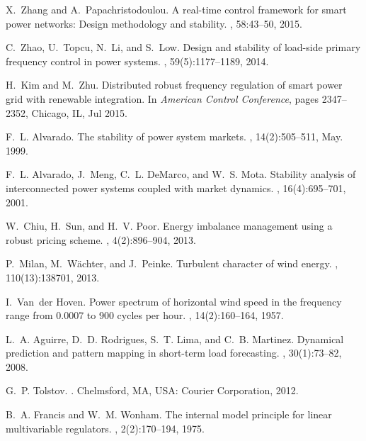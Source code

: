 \documentclass[journal]{IEEEtran}
\begin{document}
\begin{thebibliography}{10}
X.~Zhang and A.~Papachristodoulou.
\newblock A real-time control framework for smart power networks: Design
  methodology and stability.
, 58:43--50, 2015.

C.~Zhao, U.~Topcu, N.~Li, and S.~Low.
\newblock Design and stability of load-side primary frequency control in power
  systems.
, 59(5):1177--1189, 2014.

H.~Kim and M.~Zhu.
\newblock Distributed robust frequency regulation of smart power grid with
  renewable integration.
\newblock In {\em American Control Conference}, pages 2347--2352, Chicago, IL,
  Jul 2015.

F.~L. Alvarado.
\newblock The stability of power system markets.
, 14(2):505--511, May. 1999.

F.~L. Alvarado, J.~Meng, C.~L. DeMarco, and W.~S. Mota.
\newblock Stability analysis of interconnected power systems coupled with
  market dynamics.
, 16(4):695--701, 2001.

W.~Chiu, H.~Sun, and H.~V. Poor.
\newblock Energy imbalance management using a robust pricing scheme.
, 4(2):896--904, 2013.

P.~Milan, M.~W{\"a}chter, and J.~Peinke.
\newblock Turbulent character of wind energy.
, 110(13):138701, 2013.

I.~Van~der Hoven.
\newblock Power spectrum of horizontal wind speed in the frequency range from
  0.0007 to 900 cycles per hour.
, 14(2):160--164, 1957.

L.~A. Aguirre, D.~D. Rodrigues, S.~T. Lima, and C.~B. Martinez.
\newblock Dynamical prediction and pattern mapping in short-term load
  forecasting.
,
  30(1):73--82, 2008.

G.~P. Tolstov.
.
\newblock Chelmsford, MA, USA: Courier Corporation, 2012.

B.~A. Francis and W.~M. Wonham.
\newblock The internal model principle for linear multivariable regulators.
, 2(2):170--194, 1975.


\end{thebibliography}
\end{document}
